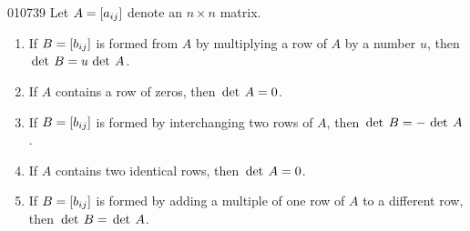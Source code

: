 \begin{lemma}{}{010739}
Let $A = \left[ a_{ij} \right]$ denote an $n \times n$ matrix.


\begin{enumerate}
\item If $B = \left[ b_{ij} \right]$ is formed from $A$ by multiplying a row of $A$ by a number $u$, then $\thinspace\operatorname{det \medspace}B = u \thinspace\operatorname{det \medspace}A$.

\item If $A$ contains a row of zeros, then $\thinspace\operatorname{det \medspace}A = 0$.

\item If $B = \left[ b_{ij} \right]$ is formed by interchanging two rows of $A$, then $\thinspace\operatorname{det \medspace}B = -\thinspace\operatorname{det \medspace}A$.

\item If $A$ contains two identical rows, then $\thinspace\operatorname{det \medspace}A = 0$.

\item If $B = \left[ b_{ij} \right]$ is formed by adding a multiple of one row of $A$ to a different row, then $\thinspace\operatorname{det \medspace}B = \thinspace\operatorname{det \medspace}A$.

\end{enumerate}
\end{lemma}

